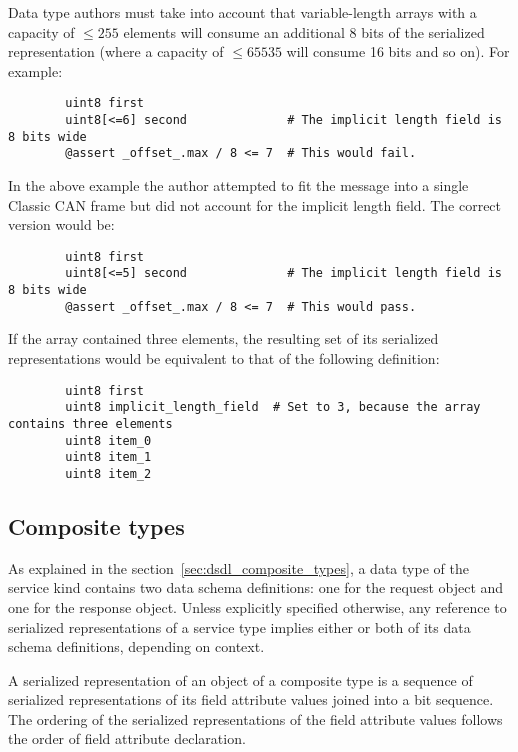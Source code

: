\begin{remark}
    Data type authors must take into account that variable-length arrays with a capacity of $\leq{}255$ elements will
    consume an additional 8 bits of the serialized representation
    (where a capacity of $\leq 65535$ will consume 16 bits and so on).
    For example:

    \begin{verbatim}
        uint8 first
        uint8[<=6] second              # The implicit length field is 8 bits wide
        @assert _offset_.max / 8 <= 7  # This would fail.
    \end{verbatim}

    In the above example the author attempted to fit the message into a single Classic CAN frame but
    did not account for the implicit length field. The correct version would be:

    \begin{verbatim}
        uint8 first
        uint8[<=5] second              # The implicit length field is 8 bits wide
        @assert _offset_.max / 8 <= 7  # This would pass.
    \end{verbatim}

    If the array contained three elements, the resulting set of its serialized representations would
    be equivalent to that of the following definition:

    \begin{verbatim}
        uint8 first
        uint8 implicit_length_field  # Set to 3, because the array contains three elements
        uint8 item_0
        uint8 item_1
        uint8 item_2
    \end{verbatim}
\end{remark}

\subsection{Composite types}

As explained in the section~\ref{sec:dsdl_composite_types}, a data type of the service kind contains
two data schema definitions: one for the request object and one for the response object.
Unless explicitly specified otherwise, any reference to serialized representations of a service type
implies either or both of its data schema definitions, depending on context.

A serialized representation of an object of a composite type is a sequence of serialized representations of
its field attribute values joined into a bit sequence.
The ordering of the serialized representations of the field attribute values follows the order
of field attribute declaration.

